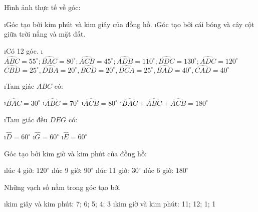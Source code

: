 \begin{Answer}{5}
		Hình ảnh thực tế về góc:
		\begin{enumerate}[+,leftmargin=*]
			\i Góc tạo bởi kim phút và kim giây của đồng hồ.
			\i Góc tạo bởi cái bóng và cây cột giữa trời nắng và mặt đất.
		\end{enumerate}
	
\end{Answer}
\begin{Answer}{6}
		\begin{enumerate}[a),leftmargin=*]
			\i Có 12 góc.
			\i $\widehat{ABC}={{55}^\circ};\widehat{BAC}={{80}^\circ};\widehat{ACB}={{45}^\circ};\widehat{ADB}={{110}^\circ};\widehat{BDC}={{130}^\circ};\widehat{ADC}={{120}^\circ}$
			$\widehat{CBD}={{25}^\circ},\widehat{DBA}={{20}^\circ},\widehat{BCD}={{20}^\circ},\widehat{DCA}={{25}^\circ},\widehat{BAD}={{40}^\circ},\widehat{CAD}={{40}^\circ}$
		\end{enumerate}
	
\end{Answer}
\begin{Answer}{7}
		\begin{enumerate}[a),leftmargin=*]
			\i Tam giác $ABC$ có:
			\begin{enumerate}[--,leftmargin=*]
				\i $\widehat{BAC}={{30}^\circ}$
				\i $\widehat{ABC}={{70}^\circ}$
				\i $\widehat{ACB}={{80}^\circ}$
				\i $\widehat{BAC}+\widehat{ABC}+\widehat{ACB}={{180}^\circ}$
			\end{enumerate}
			\i Tam giác đều $DEG$ có:
			\begin{enumerate}[--,leftmargin=*]
				\i $\widehat{D}={{60}^\circ}$
				\i $\widehat{G}={{60}^\circ}$
				\i $\widehat{E}={{60}^\circ}$
			\end{enumerate}
		\end{enumerate}
	
\end{Answer}
\begin{Answer}{8}
		Góc tạo bởi kim giờ và kim phút của đồng hồ:
		\begin{enumerate}[--,leftmargin=*]
			\i lúc 4 giờ: ${{120}^\circ}$
			\i lúc 9 giờ: ${{90}^\circ}$
			\i lúc 11 giờ: ${{30}^\circ}$
			\i lúc 6 giờ: ${{180}^\circ}$
		\end{enumerate}
	
\end{Answer}
\begin{Answer}{9}
		Những vạch số nằm trong góc tạo bởi
		\begin{enumerate}[a),leftmargin=*]
			\i kim giây và kim phút: 7; 6; 5; 4; 3
			\i kim giờ và kim phút: 11; 12; 1; 1
		\end{enumerate}
	
\end{Answer}

